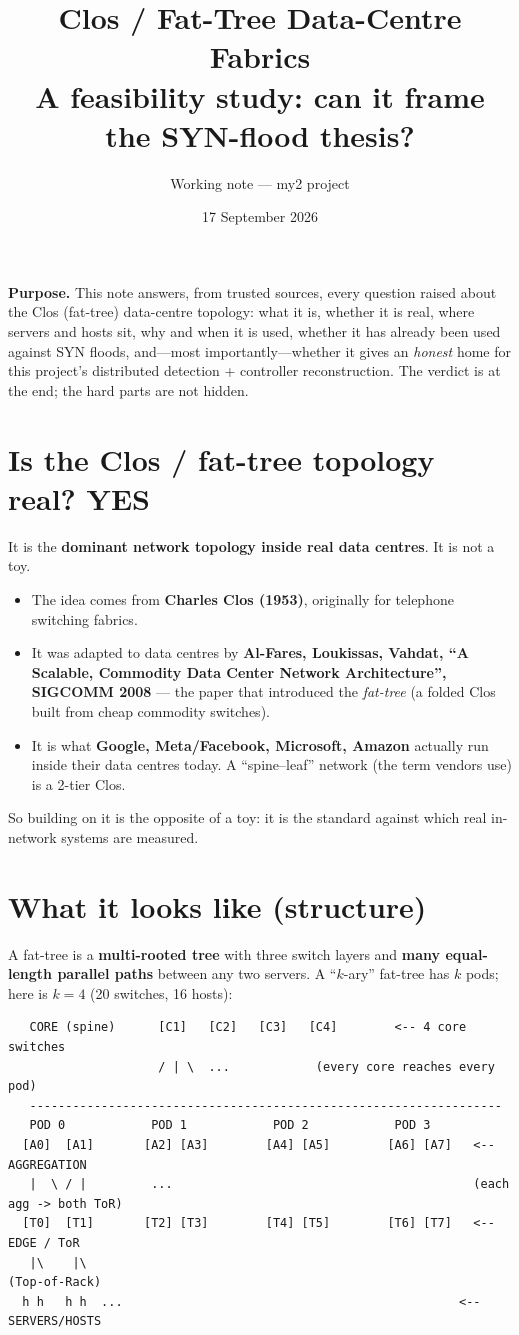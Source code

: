 \documentclass[11pt]{article}
\title{\vspace{-1.2cm}Clos / Fat-Tree Data-Centre Fabrics\\[2pt]
\large A feasibility study: can it frame the SYN-flood thesis?}
\author{Working note --- my2 project}
\date{17 September 2026}
\newcommand{\yes}{\textcolor{good}{\textbf{YES}}}
\begin{document}
\maketitle
\vspace{-0.6cm}

\noindent\textbf{Purpose.} This note answers, from trusted sources, every question raised about the Clos
(fat-tree) data-centre topology: what it is, whether it is real, where servers and hosts sit, why and
when it is used, whether it has already been used against SYN floods, and---most importantly---whether it
gives an \emph{honest} home for this project's distributed detection + controller reconstruction. The
verdict is at the end; the hard parts are not hidden.

\section{Is the Clos / fat-tree topology real? \yes}
It is the \textbf{dominant network topology inside real data centres}. It is not a toy.
\begin{itemize}[leftmargin=1.4em]
  \item The idea comes from \textbf{Charles Clos (1953)}, originally for telephone switching fabrics.
  \item It was adapted to data centres by \textbf{Al-Fares, Loukissas, Vahdat, ``A Scalable, Commodity
  Data Center Network Architecture'', SIGCOMM 2008} --- the paper that introduced the \emph{fat-tree}
  (a folded Clos built from cheap commodity switches).
  \item It is what \textbf{Google, Meta/Facebook, Microsoft, Amazon} actually run inside their data
  centres today. A ``spine--leaf'' network (the term vendors use) is a 2-tier Clos.
\end{itemize}
So building on it is the opposite of a toy: it is the standard against which real in-network systems are
measured.

\section{What it looks like (structure)}
A fat-tree is a \textbf{multi-rooted tree} with three switch layers and \textbf{many equal-length parallel
paths} between any two servers. A ``$k$-ary'' fat-tree has $k$ pods; here is $k=4$ (20 switches, 16 hosts):

\begin{verbatim}
   CORE (spine)      [C1]   [C2]   [C3]   [C4]        <-- 4 core switches
                     / | \  ...            (every core reaches every pod)
   ------------------------------------------------------------------
   POD 0            POD 1            POD 2            POD 3
  [A0]  [A1]       [A2] [A3]        [A4] [A5]        [A6] [A7]   <-- AGGREGATION
   |  \ / |         ...                                          (each agg -> both ToR)
  [T0]  [T1]       [T2] [T3]        [T4] [T5]        [T6] [T7]   <-- EDGE / ToR
   |\    |\                                                       (Top-of-Rack)
  h h   h h  ...                                               <-- SERVERS/HOSTS
\end{verbatim}
\end{document}
